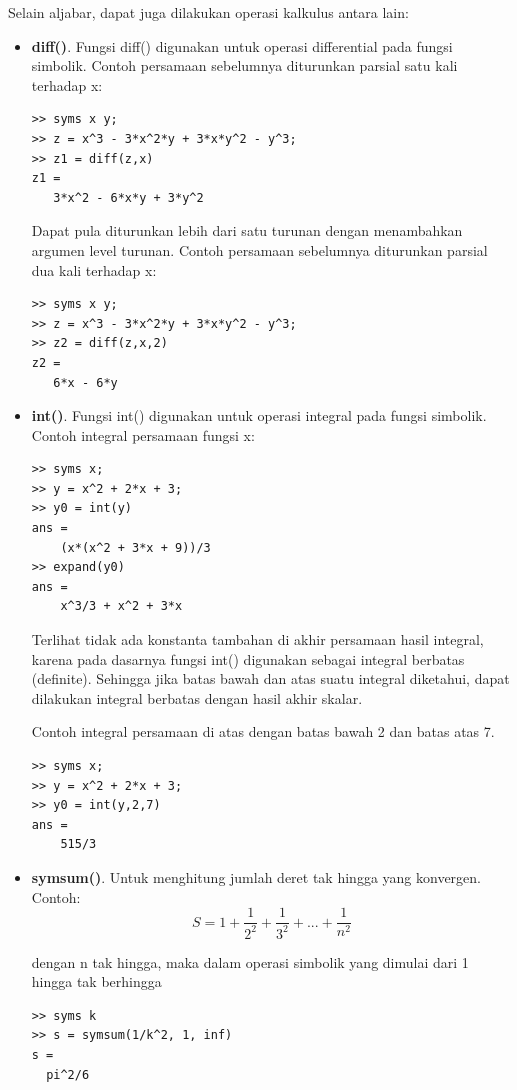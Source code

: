 \documentclass[12pt]{book}
\begin{document}
	Selain aljabar, dapat juga dilakukan operasi kalkulus antara lain:
	\begin{itemize}
		\item \textbf{diff()}. Fungsi diff() digunakan untuk operasi differential pada fungsi simbolik.
		Contoh persamaan sebelumnya diturunkan parsial satu kali terhadap x:
		\begin{verbatim}
>> syms x y;
>> z = x^3 - 3*x^2*y + 3*x*y^2 - y^3;
>> z1 = diff(z,x)
z1 =
   3*x^2 - 6*x*y + 3*y^2
		\end{verbatim}

		Dapat pula diturunkan lebih dari satu turunan dengan menambahkan argumen level turunan.
		Contoh persamaan sebelumnya diturunkan parsial dua kali terhadap x:
		\begin{verbatim}
>> syms x y;
>> z = x^3 - 3*x^2*y + 3*x*y^2 - y^3;
>> z2 = diff(z,x,2)
z2 =
   6*x - 6*y
		\end{verbatim}

		\item \textbf{int()}. Fungsi int() digunakan untuk operasi integral pada fungsi simbolik.
		Contoh integral persamaan fungsi x:
		\begin{verbatim}
>> syms x;
>> y = x^2 + 2*x + 3;
>> y0 = int(y)
ans =
    (x*(x^2 + 3*x + 9))/3
>> expand(y0)
ans =
    x^3/3 + x^2 + 3*x
		\end{verbatim}

		Terlihat tidak ada konstanta tambahan di akhir persamaan hasil integral, karena pada dasarnya fungsi int() digunakan sebagai integral berbatas (definite).
		Sehingga jika batas bawah dan atas suatu integral diketahui, dapat dilakukan integral berbatas dengan hasil akhir skalar.

		Contoh integral persamaan di atas dengan batas bawah 2 dan batas atas 7.
		\begin{verbatim}
>> syms x;
>> y = x^2 + 2*x + 3;
>> y0 = int(y,2,7)
ans =
    515/3
		\end{verbatim}

		\item \textbf{symsum()}. Untuk menghitung jumlah deret tak hingga yang konvergen.
		Contoh:
		\[ S = 1 + \frac{1}{2^2} + \frac{1}{3^2} + ... + \frac{1}{n^2}\]

		dengan n tak hingga, maka dalam operasi simbolik yang dimulai dari 1 hingga tak berhingga
		\begin{verbatim}
>> syms k
>> s = symsum(1/k^2, 1, inf)
s =
  pi^2/6
		\end{verbatim}


\end{itemize}
\end{document}
